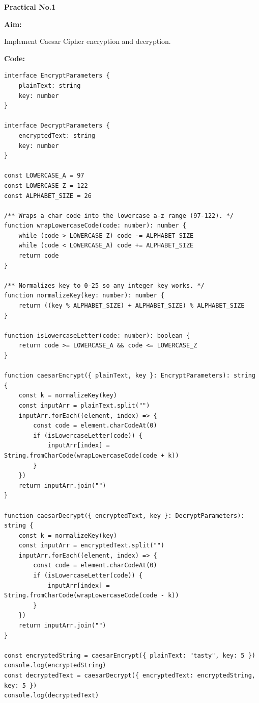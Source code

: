 \documentclass[a4paper,12pt]{article}
\begin{document}
\begin{center}
    \fontsize{16}{20}\selectfont \textbf{Practical No.1}
\end{center}

\vspace{0.5cm}

\fontsize{14}{18}\selectfont \textbf{Aim:}
\par

\fontsize{12}{14}\selectfont
Implement Caesar Cipher encryption and decryption.

\vspace{1cm}

\fontsize{14}{18}\selectfont \textbf{Code:}
\par

\vspace{0.3cm}

\fontsize{12}{14}\selectfont
\begin{verbatim}
interface EncryptParameters {
    plainText: string
    key: number
}

interface DecryptParameters {
    encryptedText: string
    key: number
}

const LOWERCASE_A = 97
const LOWERCASE_Z = 122
const ALPHABET_SIZE = 26

/** Wraps a char code into the lowercase a-z range (97-122). */
function wrapLowercaseCode(code: number): number {
    while (code > LOWERCASE_Z) code -= ALPHABET_SIZE
    while (code < LOWERCASE_A) code += ALPHABET_SIZE
    return code
}

/** Normalizes key to 0-25 so any integer key works. */
function normalizeKey(key: number): number {
    return ((key % ALPHABET_SIZE) + ALPHABET_SIZE) % ALPHABET_SIZE
}

function isLowercaseLetter(code: number): boolean {
    return code >= LOWERCASE_A && code <= LOWERCASE_Z
}

function caesarEncrypt({ plainText, key }: EncryptParameters): string {
    const k = normalizeKey(key)
    const inputArr = plainText.split("")
    inputArr.forEach((element, index) => {
        const code = element.charCodeAt(0)
        if (isLowercaseLetter(code)) {
            inputArr[index] = String.fromCharCode(wrapLowercaseCode(code + k))
        }
    })
    return inputArr.join("")
}

function caesarDecrypt({ encryptedText, key }: DecryptParameters): string {
    const k = normalizeKey(key)
    const inputArr = encryptedText.split("")
    inputArr.forEach((element, index) => {
        const code = element.charCodeAt(0)
        if (isLowercaseLetter(code)) {
            inputArr[index] = String.fromCharCode(wrapLowercaseCode(code - k))
        }
    })
    return inputArr.join("")
}

const encryptedString = caesarEncrypt({ plainText: "tasty", key: 5 })
console.log(encryptedString)
const decryptedText = caesarDecrypt({ encryptedText: encryptedString, key: 5 })
console.log(decryptedText)
\end{verbatim}
\end{document}

